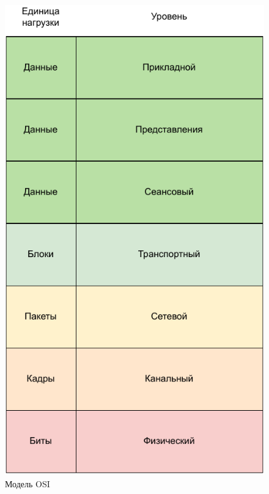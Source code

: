 \begin{figure}[h]
	\centering
	\includegraphics[scale=0.95]{img/osi.pdf}
	\caption{Модель OSI}
	\label{fig:osi}
\end{figure}

